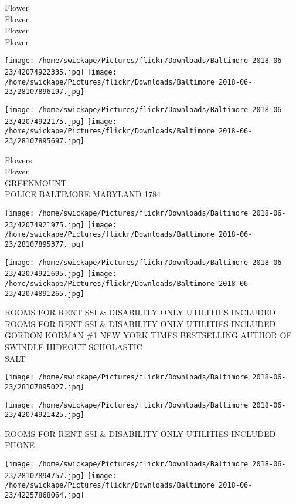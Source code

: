 \documentclass[10pt,letterpaper]{article}
\begin{document}
Flower\\
Flower\\
Flower\\
Flower
\pagebreak

\texttt{[image: /home/swickape/Pictures/flickr/Downloads/Baltimore 2018-06-23/42074922335.jpg]}
\texttt{[image: /home/swickape/Pictures/flickr/Downloads/Baltimore 2018-06-23/28107896197.jpg]}

\texttt{[image: /home/swickape/Pictures/flickr/Downloads/Baltimore 2018-06-23/42074922175.jpg]}
\texttt{[image: /home/swickape/Pictures/flickr/Downloads/Baltimore 2018-06-23/28107895697.jpg]}

Flowers\\
Flower\\
GREENMOUNT\\
POLICE BALTIMORE MARYLAND 1784
\pagebreak

\texttt{[image: /home/swickape/Pictures/flickr/Downloads/Baltimore 2018-06-23/42074921975.jpg]}
\texttt{[image: /home/swickape/Pictures/flickr/Downloads/Baltimore 2018-06-23/28107895377.jpg]}

\texttt{[image: /home/swickape/Pictures/flickr/Downloads/Baltimore 2018-06-23/42074921695.jpg]}
\texttt{[image: /home/swickape/Pictures/flickr/Downloads/Baltimore 2018-06-23/42074891265.jpg]}

ROOMS FOR RENT SSI \& DISABILITY ONLY UTILITIES INCLUDED\\
ROOMS FOR RENT SSI \& DISABILITY ONLY UTILITIES INCLUDED\\
GORDON KORMAN \#1 NEW YORK TIMES BESTSELLING AUTHOR OF SWINDLE HIDEOUT SCHOLASTIC\\
SALT
\pagebreak

\texttt{[image: /home/swickape/Pictures/flickr/Downloads/Baltimore 2018-06-23/28107895027.jpg]}

\vspace{0.25in}
\texttt{[image: /home/swickape/Pictures/flickr/Downloads/Baltimore 2018-06-23/42074921425.jpg]}

ROOMS FOR RENT SSI \& DISABILITY ONLY UTILITIES INCLUDED\\
PHONE
\pagebreak

\texttt{[image: /home/swickape/Pictures/flickr/Downloads/Baltimore 2018-06-23/28107894757.jpg]}
\texttt{[image: /home/swickape/Pictures/flickr/Downloads/Baltimore 2018-06-23/42257868064.jpg]}
\end{document}
